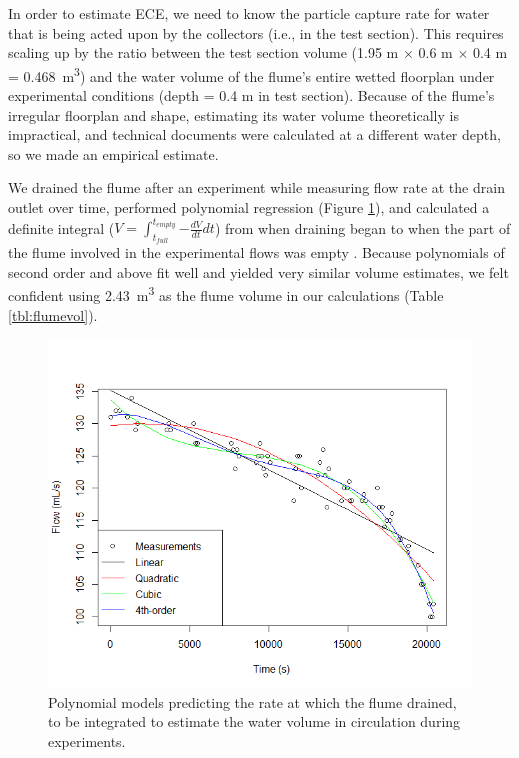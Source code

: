 \documentclass[geosciences,article,submit,moreauthors,pdftex]{Definitions/mdpi}
\begin{document}
In order to estimate ECE, we need to know the particle capture rate for water that is being acted upon by the collectors (i.e., in the test section). This requires scaling up by the ratio between the test section volume (1.95 m $\times$ 0.6 m $\times$ 0.4 m = \SI{0.468}{m^3}) and the water volume of the flume's entire wetted floorplan under experimental conditions (depth = 0.4 m in test section). Because of the flume's irregular floorplan and shape, estimating its water volume theoretically is impractical, and technical documents were calculated at a different water depth, so we made an empirical estimate. 

We drained the flume after an experiment while measuring flow rate at the drain outlet over time, performed polynomial regression (Figure \ref{fig:flumevol}), and calculated a definite integral ($V = \int_{t_{full}}^{t_{empty}}{-\frac{dV}{dt}dt}$) from when draining began to when the part of the flume involved in the experimental flows was empty . Because polynomials of second order and above fit well and yielded very similar volume estimates, we felt confident using \SI{2.43}{\metre\cubed} as the flume volume in our calculations (Table \ref{tbl:flumevol}).

\begin{figure}[H]
\centering
\includegraphics[width=4.7in]{../pics/flumevol.png}
\caption{Polynomial models predicting the rate at which the flume drained, to be integrated to estimate the water volume in circulation during experiments.}
\label{fig:flumevol}
\end{figure}
\end{document}
